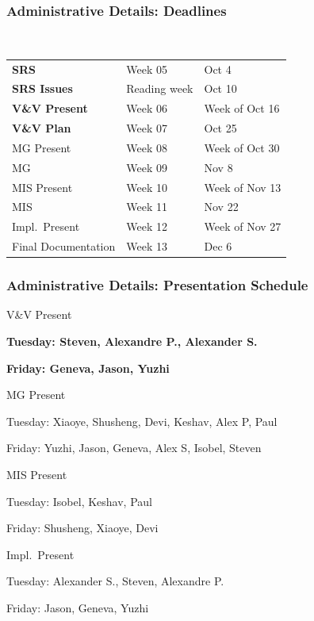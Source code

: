 \documentclass[t,12pt,numbers,fleqn]{beamer}
\begin{document}
\begin{frame}
\frametitle{Administrative Details: Deadlines}
~\newline
\begin{tabular}{l l l}
\textbf{SRS} & Week 05 & Oct 4\\
\textbf{SRS Issues} & Reading week & Oct 10\\
\textbf{V\&V Present} & Week 06 & Week of Oct 16\\
\textbf{V\&V Plan} & Week 07 & Oct 25\\
MG Present & Week 08 & Week of Oct 30\\
MG & Week 09 & Nov 8\\
MIS Present & Week 10 & Week of Nov 13\\
MIS & Week 11 & Nov 22\\
Impl.\ Present & Week 12 & Week of Nov 27\\
Final Documentation & Week 13 & Dec 6\\
\end {tabular}

\end{frame}


\begin{frame}
\frametitle{Administrative Details: Presentation Schedule}

\bi
\item V\&V Present
\bi
\item \textbf{Tuesday: Steven, Alexandre P., Alexander S.}
\item \textbf{Friday: Geneva, Jason, Yuzhi}
\ei
\item MG Present
\bi
\item Tuesday: Xiaoye, Shusheng, Devi, Keshav, Alex P, Paul
\item Friday: Yuzhi, Jason, Geneva, Alex S, Isobel, Steven
\ei
\item MIS Present
\bi
\item Tuesday: Isobel, Keshav, Paul
\item Friday: Shusheng, Xiaoye, Devi
\ei
\item Impl.\ Present
\bi
\item Tuesday: Alexander S., Steven, Alexandre P.
\item Friday: Jason, Geneva, Yuzhi
\ei

\ei

\end{frame}

\end{document}
